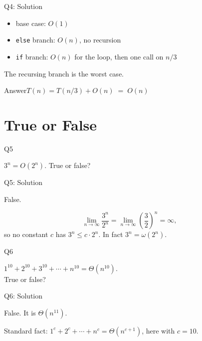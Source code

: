 \documentclass[10pt,aspectratio=169]{beamer}
\newcommand{\answer}[1]{\begin{alertblock}{Answer}#1\end{alertblock}}
\begin{document}
\begin{frame}{Q4: Solution}
  \begin{itemize}
    \item base case: $O(1)$
    \item \texttt{else} branch: $O(n)$, no recursion
    \item \texttt{if} branch: $O(n)$ for the loop, then \alert{one} call on $n/3$
  \end{itemize}

  \bigskip
  The recursing branch is the worst case.

  \answer{$T(n) = T(n/3) + O(n) \;=\; O(n)$}
\end{frame}

\section{True or False}

\begin{frame}{Q5}
  \begin{center}
    \Large
    $3^n = O(2^n)$. \quad True or false?
  \end{center}
\end{frame}

\begin{frame}{Q5: Solution}
  \begin{center}
    \alert{\Large False.}
  \end{center}

  \bigskip
  \[
    \lim_{n \to \infty} \frac{3^n}{2^n}
    = \lim_{n \to \infty}\left(\frac32\right)^{n} = \infty,
  \]
  so no constant $c$ has $3^n \le c \cdot 2^n$. In fact $3^n = \omega(2^n)$.
\end{frame}

\begin{frame}{Q6}
  \begin{center}
    \Large
    $1^{10} + 2^{10} + 3^{10} + \cdots + n^{10} = \Theta(n^{10})$.\\[0.6em]
    True or false?
  \end{center}
\end{frame}

\begin{frame}{Q6: Solution}
  \begin{center}
    \alert{\Large False.} \quad It is $\Theta(n^{11})$.
  \end{center}

  \bigskip
  Standard fact: $1^c + 2^c + \cdots + n^c = \Theta(n^{c+1})$, here with $c = 10$.
\end{frame}
\end{document}
